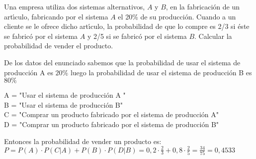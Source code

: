 \problem
Una empresa utiliza dos sistemas alternativos, $A$ y $B$, en  la  fabricaci{\'o}n
de un art{\'\i}culo, fabricando  por el sistema $A$    el  20\%  de  su  producci{\'o}n.
Cuando a un cliente se le ofrece dicho art{\'\i}culo, la probabilidad de que
lo compre es 2/3 si {\'e}ste se fabric{\'o} por el sistema $A$  y   2/5  si  se
fabric{\'o} por  el  sistema  $B$.  Calcular  la  probabilidad  de  vender  el
producto.

De los datos del enunciado sabemos que la probabilidad de usar el sistema de producción A es  $20\%$ luego la probabilidad de usar  el sistema de producción B es  $80\%$   
		\begin{flushleft}
			A = "Usar el sistema de producción A " \\
			B = "Usar el sistema de producción B" \\
			C = "Comprar un producto fabricado por el sistema de producción A" \\
			D = "Comprar un producto fabricado por el sistema de producción B"\\
		
		\end{flushleft}
		Entonces la probabilidad de vender un producto es:\\
	$P = P(A) \cdot P(C|A) + P(B) \cdot P(D|B) = 0,2 \cdot\frac{2}{3} + 0,8 \cdot\frac{2}{5} = \frac{34}{75} = 0,4533 $

